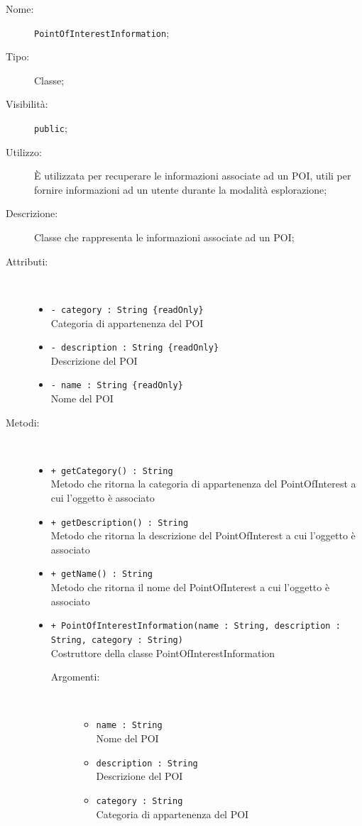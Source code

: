\documentclass[../DefinizioneDiProdotto.tex]{subfiles}
\begin{document}
    \begin{description}
\item[Nome:] \texttt{PointOfInterestInformation};
\item[Tipo:] Classe;
\item[Visibilità:] \texttt{public};
\item[Utilizzo:] È utilizzata per recuperare le informazioni associate ad un POI, utili per fornire informazioni ad un utente durante la modalità esplorazione;
\item[Descrizione:] Classe che rappresenta le informazioni associate ad un POI;
\item[Attributi:] \
\begin{itemize}
\item \texttt{- category : String  \{readOnly\}}\\
Categoria di appartenenza del POI

\item \texttt{- description : String  \{readOnly\}}\\
Descrizione del POI

\item \texttt{- name : String  \{readOnly\}}\\
Nome del POI

\end{itemize}
\item[Metodi:] \
\begin{itemize}
\item \texttt{+ getCategory() : String}\\
Metodo che ritorna la categoria di appartenenza del PointOfInterest a cui l'oggetto è associato
 \item \texttt{+ getDescription() : String}\\
Metodo che ritorna la descrizione del PointOfInterest a cui l'oggetto è associato
 \item \texttt{+ getName() : String}\\
Metodo che ritorna il nome del PointOfInterest a cui l'oggetto è associato
 \item \texttt{+ PointOfInterestInformation(name : String, description : String, category : String)}\\
Costruttore della classe PointOfInterestInformation
 \begin{description}
\item[Argomenti:] \
\begin{itemize}
\item \texttt{name : String}\\
Nome del POI\item \texttt{description : String}\\
Descrizione del POI\item \texttt{category : String}\\
Categoria di appartenenza del POI\end{itemize}
\end{description}
\end{itemize}
\end{description}
\end{document}
